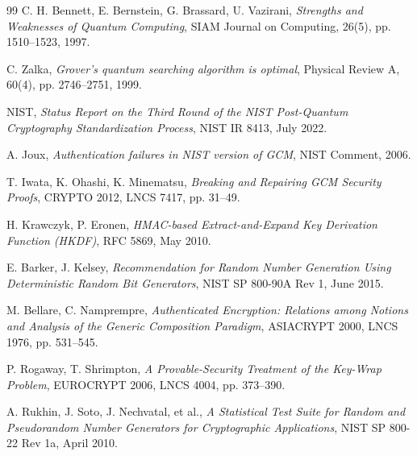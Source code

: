 \documentclass[11pt,a4paper]{article}
\begin{document}
\begin{thebibliography}{99}
  C. H. Bennett, E. Bernstein, G. Brassard, U. Vazirani,
  \emph{Strengths and Weaknesses of Quantum Computing},
  SIAM Journal on Computing, 26(5), pp. 1510--1523, 1997.

  C. Zalka,
  \emph{Grover's quantum searching algorithm is optimal},
  Physical Review A, 60(4), pp. 2746--2751, 1999.

  NIST,
  \emph{Status Report on the Third Round of the NIST Post-Quantum Cryptography Standardization Process},
  NIST IR 8413, July 2022.

  A. Joux,
  \emph{Authentication failures in NIST version of GCM},
  NIST Comment, 2006.

  T. Iwata, K. Ohashi, K. Minematsu,
  \emph{Breaking and Repairing GCM Security Proofs},
  CRYPTO 2012, LNCS 7417, pp. 31--49.

  H. Krawczyk, P. Eronen,
  \emph{HMAC-based Extract-and-Expand Key Derivation Function (HKDF)},
  RFC 5869, May 2010.

  E. Barker, J. Kelsey,
  \emph{Recommendation for Random Number Generation Using Deterministic Random Bit Generators},
  NIST SP 800-90A Rev 1, June 2015.

  M. Bellare, C. Namprempre,
  \emph{Authenticated Encryption: Relations among Notions and Analysis of the Generic Composition Paradigm},
  ASIACRYPT 2000, LNCS 1976, pp. 531--545.

  P. Rogaway, T. Shrimpton,
  \emph{A Provable-Security Treatment of the Key-Wrap Problem},
  EUROCRYPT 2006, LNCS 4004, pp. 373--390.

  A. Rukhin, J. Soto, J. Nechvatal, et al.,
  \emph{A Statistical Test Suite for Random and Pseudorandom Number Generators for Cryptographic Applications},
  NIST SP 800-22 Rev 1a, April 2010.

\end{thebibliography}
\end{document}
